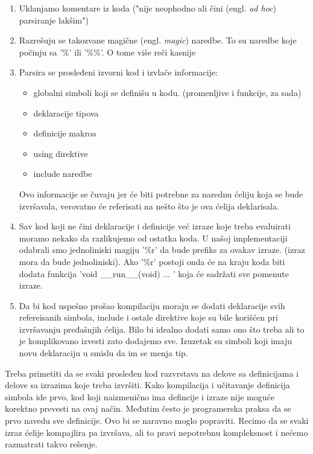 \documentclass[a4paper]{article}
\newcommand{\eng}[1]{(engl. \textit{#1})}
\begin{document}
{\begin{enumerate}
    \item Uklanjamo komentare iz koda ("nije neophodno ali čini \eng{ad hoc} parsiranje lakšim")
    \item Razrešuju se takozvane magične \eng{magic} naredbe. To su naredbe koje
      počinju sa '\%' ili '\%\%'. O tome više reči kasnije
    \item Parsira se prosleđeni izvorni kod i izvlače informacije:
      \begin{itemize}
          \item globalni simboli koji se definišu u kodu. (promenljive i funkcije, za sada)
          \item deklaracije tipova
          \item definicije makroa
          \item using direktive
          \item include naredbe
      \end{itemize}
      Ovo informacije se čuvaju jer će biti potrebne za narednu ćeliju koja se bude izvršavala,
      verovatno će referisati na nešto što je ova ćelija deklarisala.
    \item Sav kod koji ne čini deklaracije i definicije već izraze koje treba evaluirati
      moramo nekako da razlikujemo od ostatka koda. U našoj implementaciji odabrali smo
      jednoliniski magiju '\%r' da bude prefiks za ovakav izraze.
      (izraz mora da bude jednoliniski). Ako '\%r' postoji onda će na kraju koda
      biti dodata funkcija 'void \_\_run\_\_(void) { ...  }' koja će sadržati sve
      pomenute izraze.
    \item Da bi kod uspešno prošao kompilaciju moraju se dodati deklaracije
      svih refereisanih simbola, include i ostale direktive koje su bile korišćen
      pri izvršavanju pređašnjih ćelija. Bilo bi idealno dodati samo ono što treba
      ali to je komplikovano izvesti zato dodajemo sve. Izuzetak su simboli
      koji imaju novu deklaraciju u smislu da im se menja tip.

\end{enumerate}

Treba primetiti da se svaki prosleđen kod razvrstava na delove sa definicijama
i delove sa izrazima koje treba izvršiti. Kako kompilacija i učitavanje 
definicija simbola ide prvo, kod koji naizmenično ima defincije i izraze nije moguće
korektno prevesti na ovaj način. Međutim često je programerska praksa da 
se prvo navedu sve definicije. Ovo bi se naravno moglo popraviti. Recimo
da se svaki izraz ćelije kompajlira pa izvršava, ali to pravi nepotrebnu kompleksnost
i nećemo razmatrati takvo rešenje. 

}
\end{document}
